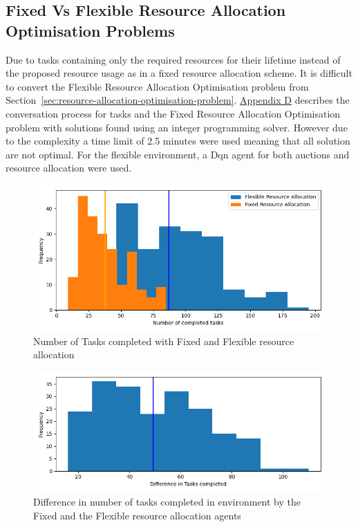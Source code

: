 \subsection{Fixed Vs Flexible Resource Allocation Optimisation Problems}
\label{subsec:fixed-vs-flexible-resource-allocation-optimisation-problems}
Due to tasks containing only the required resources for their lifetime instead of the proposed resource usage as in a
fixed resource allocation scheme. It is difficult to convert the Flexible Resource Allocation Optimisation problem from
Section~\ref{sec:resource-allocation-optimisation-problem}.
\hyperref[app:fixed-resource-allocation-optimisation-problem]{Appendix D} describes the conversation process for tasks
and the Fixed Resource Allocation Optimisation problem with solutions found using an integer programming solver. However
due to the complexity a time limit of 2.5 minutes were used meaning that all solution are not optimal. For the flexible
environment, a Dqn agent for both auctions and resource allocation were used.

\begin{figure}[H]
    \centering
    \includegraphics[width=\textwidth]{figures/5_evaluation_figs/fixed_flexible_completed_tasks.png}
    \caption{Number of Tasks completed with Fixed and Flexible resource allocation}
    \label{fig:number-task-completed-fixed-flexible}
\end{figure}

\begin{figure}[H]
    \centering
    \includegraphics[width=\textwidth]{figures/5_evaluation_figs/fixed_flexible_tasks_difference.png}
    \caption{Difference in number of tasks completed in environment by the Fixed and the Flexible resource allocation agents}
    \label{fig:difference-number-task-completed-fixed-flexible}
\end{figure}

